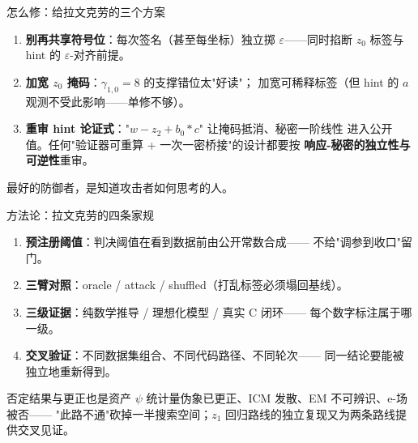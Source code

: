 \documentclass[11pt,aspectratio=169]{ctexbeamer}
\begin{document}
\begin{frame}{怎么修：给拉文克劳的三个方案}
  \begin{enumerate}
    \item \textbf{别再共享符号位}：每次签名（甚至每坐标）独立掷
          $\varepsilon$——同时掐断 $z_0$ 标签与 hint 的 $\varepsilon$-对齐前提。
    \item \textbf{加宽 $z_0$ 掩码}：$\gamma_{1,0}=8$ 的支撑错位太"好读"；
          加宽可稀释标签（但 hint 的 $a$ 观测不受此影响——单修不够）。
    \item \textbf{重审 hint 论证式}："$w-z_2+b_0*c$" 让掩码抵消、秘密一阶线性
          进入公开值。任何"验证器可重算 + 一次一密桥接"的设计都要按
          \textbf{响应-秘密的独立性与可逆性}重审。
  \end{enumerate}
  \begin{center}
    {\color{ravbronze}\small 最好的防御者，是知道攻击者如何思考的人。}
  \end{center}
\end{frame}

\begin{frame}{方法论：拉文克劳的四条家规}
  \begin{enumerate}
    \item \textbf{预注册阈值}：判决阈值在看到数据前由公开常数合成——
          不给"调参到收口"留门。
    \item \textbf{三臂对照}：oracle / attack / shuffled（打乱标签必须塌回基线）。
    \item \textbf{三级证据}：纯数学推导 / 理想化模型 / 真实 C 闭环——
          每个数字标注属于哪一级。
    \item \textbf{交叉验证}：不同数据集组合、不同代码路径、不同轮次——
          同一结论要能被独立地重新得到。
  \end{enumerate}
  \begin{exampleblock}{否定结果与更正也是资产}
    \small $\psi$ 统计量伪象已更正、ICM 发散、EM 不可辨识、e-场被否——
    "此路不通"砍掉一半搜索空间；$z_1$ 回归路线的独立复现又为两条路线提供交叉见证。
  \end{exampleblock}
\end{frame}
\end{document}
